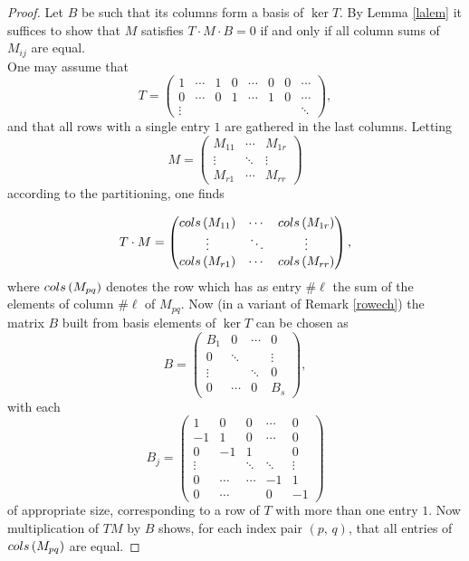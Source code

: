 \documentclass[10pt,a4paper]{amsart}
\begin{document}
\begin{proof} 
Let $B$ be such that its columns form a basis of $\ker T$. By Lemma \ref{lalem} it suffices to show that $M$ satisfies $T\cdot M\cdot B=0$ if and only if  all column sums of $M_{ij}$ are equal.\\
One may assume that 
\[
T=\begin{pmatrix} 1&\cdots&1&0&\cdots& 0& 0&\cdots\\
0&\cdots &0&1&\cdots&1&0&\cdots\\
\vdots&&&&&&&\ddots
\end{pmatrix},
\]
and that all rows with a single entry $1$ are gathered in the last columns. Letting
\[
M=\begin{pmatrix} M_{11}&\cdots&M_{1r}\\
          \vdots & \ddots&\vdots \\
               M_{r1}&\cdots & M_{rr}\end{pmatrix}
\]
according to the partitioning, one finds

\[
T\cdot M=\begin{pmatrix}{\rm cols}\,( M_{11})&\cdots&{\rm cols}\,(M_{1r})\\
          \vdots & \ddots&\vdots \\
               {\rm cols}\,(M_{r1})&\cdots & {\rm cols}\,(M_{rr})\end{pmatrix},
\]
where ${\rm cols}\,(M_{pq})$ denotes the row which has as entry $\#\ell$ the sum of the elements of column $\#\ell$ of $M_{pq}$.
Now (in a variant of Remark \ref{rowech}) the matrix $B$ built from basis elements of $\ker T$ can be chosen as
\[
B=\begin{pmatrix} B_1&0&\cdots& 0\\
                             0& \ddots &  & \vdots\\
                             \vdots& & \ddots &0\\
                              0& \cdots &  0& B_s
\end{pmatrix},
\]
with each
\[
B_j=\begin{pmatrix} 1&0&0&\cdots& 0\\
                               -1&1&0&\cdots &0\\
0&-1& 1 && 0  \\
\vdots& & \ddots &\ddots & \vdots\\
0&\cdots &\cdots & -1& 1 \\
0&\cdots &&0 &-1
\end{pmatrix}
\]
of appropriate size, corresponding to a row of $T$ with more than one entry $1$. Now multiplication of $TM$ by $B$ shows, for each index pair $(p,\,q)$, that all entries of ${\rm cols}\,(M_{pq})$ are equal.
\end{proof}
\end{document}
